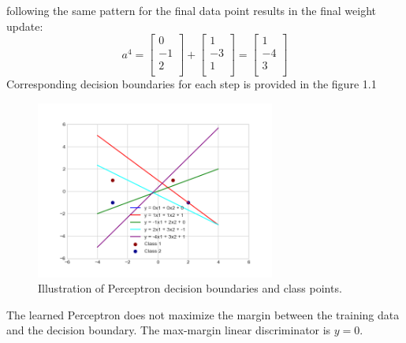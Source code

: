\documentclass[12pt]{article}
\numberwithin{equation}{section}
\numberwithin{table}{section}
\numberwithin{figure}{section}
\begin{document}
following the same pattern for the final data point results in the final weight update:
$$
	a^4 = \begin{bmatrix}
	0 \\
	-1 \\
	2 \\
	\end{bmatrix} + \begin{bmatrix}
	1 \\
	-3 \\
	1 \\
	\end{bmatrix} = \begin{bmatrix}
	1 \\
	-4 \\
	3 \\
	\end{bmatrix}
$$
Corresponding decision boundaries for each step is provided in the figure 1.1

\begin{figure}[!h]\centering
	\includegraphics[width=0.7\textwidth]{plot_1.PNG}
	\caption{Illustration of Perceptron decision boundaries and class points.}
	\label{pl1}
\end{figure}

The learned Perceptron does not maximize the margin between the training data and the decision boundary. The max-margin linear discriminator is $y = 0$.
\end{document}
